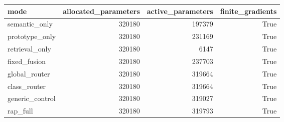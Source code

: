 \begin{tabular}{lrrr}
\toprule
mode & allocated_parameters & active_parameters & finite_gradients \\
\midrule
semantic_only & 320180 & 197379 & True \\
prototype_only & 320180 & 231169 & True \\
retrieval_only & 320180 & 6147 & True \\
fixed_fusion & 320180 & 237703 & True \\
global_router & 320180 & 319664 & True \\
class_router & 320180 & 319664 & True \\
generic_control & 320180 & 319027 & True \\
rap_full & 320180 & 319793 & True \\
\bottomrule
\end{tabular}
